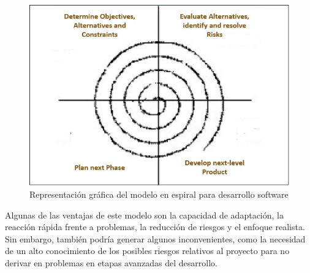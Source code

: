 \documentclass[12pt,spanish,chapterprefix, numbers=noenddot]{book}
\numberwithin{equation}{section}
\numberwithin{figure}{section}
\begin{document}
\begin{figure}[hbt!]
\centering
\includegraphics[width=12cm]{Figs/spiral_model.jpg}
\par
\caption{\label{fig:spiralModel}Representación gráfica del modelo en espiral para desarrollo software}
\end{figure}

Algunas de las ventajas de este modelo son la capacidad de adaptación, la reacción rápida frente a problemas, la reducción de riesgos y el enfoque realista. Sin embargo, también podría generar algunos inconvenientes, como la necesidad de un alto conocimiento de los posibles riesgos relativos al proyecto para no derivar en problemas en etapas avanzadas del desarrollo. 
\end{document}

